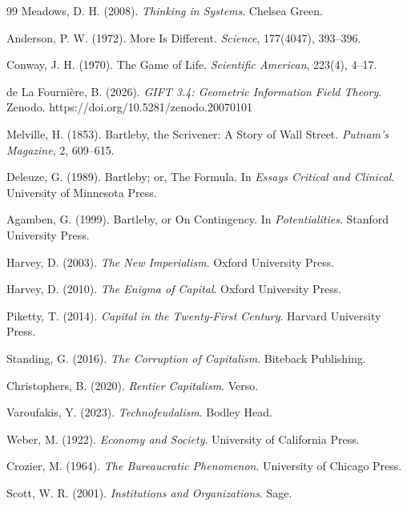\documentclass[11pt,oneside]{book}
\theoremstyle{plain}
\theoremstyle{definition}
\theoremstyle{remark}
\begin{document}
\begin{thebibliography}{99}
Meadows, D. H. (2008).
\newblock
\emph{Thinking in Systems}.
\newblock Chelsea Green.

Anderson, P. W. (1972).
\newblock More Is Different.
\newblock
\emph{Science}, 177(4047), 393--396.

Conway, J. H. (1970).
\newblock The Game of Life.
\newblock
\emph{Scientific American}, 223(4), 4--17.

de La Fourni\`ere, B. (2026).
\newblock
\emph{GIFT 3.4: Geometric Information Field Theory}.
\newblock Zenodo.
\newblock https://doi.org/10.5281/zenodo.20070101

Melville, H. (1853).
\newblock Bartleby, the Scrivener: A Story of Wall Street.
\newblock
\emph{Putnam's Magazine}, 2, 609--615.

Deleuze, G. (1989).
\newblock Bartleby; or, The Formula.
\newblock In
\emph{Essays Critical and Clinical}.
\newblock University of Minnesota Press.

Agamben, G. (1999).
\newblock Bartleby, or On Contingency.
\newblock In
\emph{Potentialities}.
\newblock Stanford University Press.

Harvey, D. (2003).
\newblock
\emph{The New Imperialism}.
\newblock Oxford University Press.

Harvey, D. (2010).
\newblock
\emph{The Enigma of Capital}.
\newblock Oxford University Press.

Piketty, T. (2014).
\newblock
\emph{Capital in the Twenty-First Century}.
\newblock Harvard University Press.

Standing, G. (2016).
\newblock
\emph{The Corruption of Capitalism}.
\newblock Biteback Publishing.

Christophers, B. (2020).
\newblock
\emph{Rentier Capitalism}.
\newblock Verso.

Varoufakis, Y. (2023).
\newblock
\emph{Technofeudalism}.
\newblock Bodley Head.

Weber, M. (1922).
\newblock
\emph{Economy and Society}.
\newblock University of California Press.

Crozier, M. (1964).
\newblock
\emph{The Bureaucratic Phenomenon}.
\newblock University of Chicago Press.

Scott, W. R. (2001).
\newblock
\emph{Institutions and Organizations}.
\newblock Sage.


\end{thebibliography}
\end{document}
